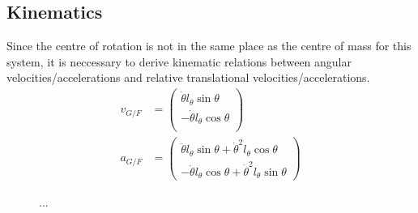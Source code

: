 \documentclass[11pt]{article}
\begin{document}
\subsection*{Kinematics}\label{sec:kin}
Since the centre of rotation is not in the same place as the centre of mass for this system, it is neccessary to derive kinematic relations between angular velocities/accelerations and relative translational velocities/accelerations.
\begin{align}
  v_{G/F} &=
  \begin{pmatrix}
     \dot{\theta}l_{\theta}\sin\theta \\
    -\dot{\theta}l_{\theta}\cos\theta \\
  \end{pmatrix} \label{eq:kin1} \\
  a_{G/F} &=
  \begin{pmatrix}
     \ddot{\theta}l_{\theta}\sin\theta + \dot{\theta}^2l_{\theta}\cos\theta \\
    -\ddot{\theta}l_{\theta}\cos\theta + \dot{\theta}^2l_{\theta}\sin\theta 
  \end{pmatrix} \label{eq:kin2}
\end{align}
\begin{figure}[h!]
  \centering
  \caption{...}\label{fig:kin_sketch}
\end{figure}

\end{document}
